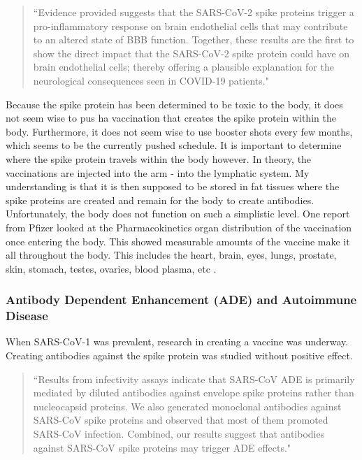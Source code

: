 \documentclass[10pt, a4paper, twocolumn]{book}
\begin{document}
\begin{quotation}
	``Evidence provided suggests that the SARS-CoV-2 spike proteins trigger a pro-inflammatory response on brain endothelial cells that may contribute to an altered state of BBB function. Together, these results are the first to show the direct impact that the SARS-CoV-2 spike protein could have on brain endothelial cells; thereby offering a plausible explanation for the neurological consequences seen in COVID-19 patients." \citep{SpikeBBBFunction}
\end{quotation}

Because the spike protein has been determined to be toxic to the body, it does not seem wise to pus ha vaccination that creates the spike protein within the body. Furthermore, it does not seem wise to use booster shots every few months, which seems to be the currently pushed schedule. It is important to determine where the spike protein travels within the body however. In theory, the vaccinations are injected into the arm - into the lymphatic system. My understanding is that it is then supposed to be stored in fat tissues where the spike proteins are created and remain for the body to create antibodies. Unfortunately, the body does not function on such a simplistic level. One report from Pfizer looked at the Pharmacokinetics organ distribution of the vaccination once entering the body. This showed measurable amounts of the vaccine make it all throughout the body. This includes the heart, brain, eyes, lungs, prostate, skin, stomach, testes, ovaries, blood plasma, etc \citep{mRNAPharmacokineticsOrganDistribution}.




\subsubsection{Antibody Dependent Enhancement (ADE) and Autoimmune Disease}

When SARS-CoV-1 was prevalent, research in creating a vaccine was underway. Creating antibodies against the spike protein was studied without positive effect.

\begin{quotation}
	``Results from infectivity assays indicate that SARS-CoV ADE is primarily mediated by diluted antibodies against envelope spike proteins rather than nucleocapsid proteins. We also generated monoclonal antibodies against SARS-CoV spike proteins and observed that most of them promoted SARS-CoV infection. Combined, our results suggest that antibodies against SARS-CoV spike proteins may trigger ADE effects." \citep{ADESpikeProtein}
\end{quotation}
\end{document}

